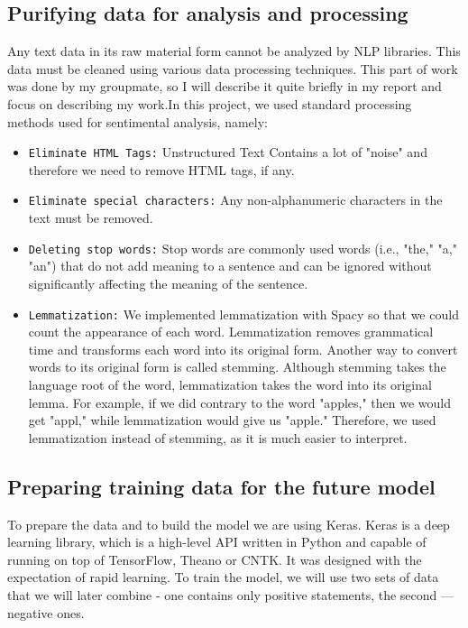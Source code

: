 \documentclass[]{article}
\begin{document}
\subsection{Purifying data for analysis and processing}
Any text data in its raw material form cannot be analyzed by NLP libraries. This data must be cleaned using various data processing techniques. This part of work was done by my groupmate, so I will describe it quite briefly in my report and focus on describing my work.In this project, we used standard processing methods used for sentimental analysis, namely:

\begin{itemize}
\item
  \texttt{Eliminate HTML Tags:}
  Unstructured Text Contains a lot of "noise" and therefore we need to remove HTML tags, if any.
\item
  \texttt{Eliminate special characters:}
  Any non-alphanumeric characters in the text must be removed.
\item
  \texttt{Deleting stop words:}
  Stop words are commonly used words (i.e., "the," "a," "an") that do not add meaning to a sentence and can be ignored without significantly affecting the meaning of the sentence.
\item
  \texttt{Lemmatization:}
  We implemented lemmatization with Spacy so that we could count the appearance of each word. Lemmatization removes grammatical time and transforms each word into its original form. Another way to convert words to its original form is called stemming. Although stemming takes the language root of the word, lemmatization takes the word into its original lemma. For example, if we did contrary to the word "apples," then we would get "appl," while lemmatization would give us "apple." Therefore, we used lemmatization instead of stemming, as it is much easier to interpret.
  
\end{itemize}

\subsection{Preparing training data for the future model}
To prepare the data and to build the model we are using Keras.
Keras is a deep learning library, which is a high-level API written in Python and capable of running on top of TensorFlow, Theano or CNTK. It was designed with the expectation of rapid learning.
To train the model, we will use two sets of data that we will later combine - one contains only positive statements, the second --- negative ones.
\end{document}
